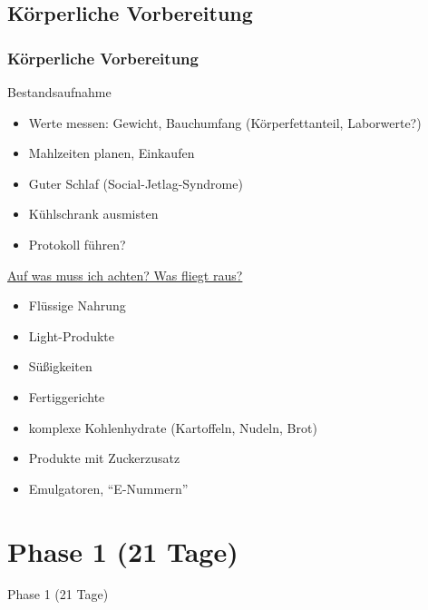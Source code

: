 \documentclass[xcolor=dvipsnames]{beamer}
\begin{document}
    \subsection{Körperliche Vorbereitung}
    \begin{frame}[allowframebreaks]
        \frametitle{Körperliche Vorbereitung}

        \begin{block}{Bestandsaufnahme}
            \begin{itemize}
                \setlength\itemsep{1em}
                \item Werte messen: Gewicht, Bauchumfang (Körperfettanteil, Laborwerte?)
                \item Mahlzeiten planen, Einkaufen
                \item Guter Schlaf (Social-Jetlag-Syndrome)
                \item Kühlschrank ausmisten
                \item Protokoll führen?
            \end{itemize}
        \end{block}

        \framebreak

        \underline{Auf was muss ich achten? Was fliegt raus?}
        \begin{itemize}
            \setlength\itemsep{1em}
            \item Flüssige Nahrung
            \item Light-Produkte
            \item Süßigkeiten
            \item Fertiggerichte
            \item komplexe Kohlenhydrate (Kartoffeln, Nudeln, Brot)
            \item Produkte mit Zuckerzusatz
            \item Emulgatoren, "`E-Nummern"'
        \end{itemize}
    \end{frame}


    \section{Phase 1 (21 Tage)}
    {
        \begin{frame}
            \begin{center}
                \Huge Phase 1 (21 Tage)
            \end{center}
        \end{frame}
    }
\end{document}
